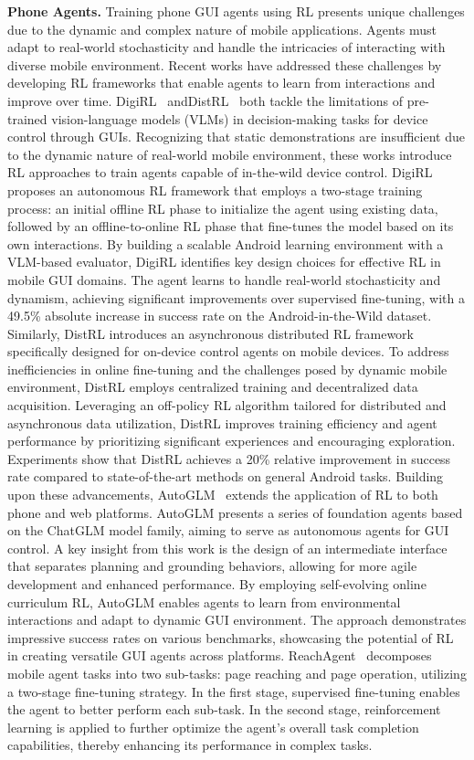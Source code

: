 \noindent\textbf{Phone Agents.}
Training phone GUI agents using RL presents unique challenges due to the dynamic and complex nature of mobile applications. Agents must adapt to real-world stochasticity and handle the intricacies of interacting with diverse mobile environment. Recent works have addressed these challenges by developing RL frameworks that enable agents to learn from interactions and improve over time.
DigiRL~\cite{bai2024digirl} andDistRL~\cite{wang2024distrl} both tackle the limitations of pre-trained vision-language models (VLMs) in decision-making tasks for device control through GUIs. Recognizing that static demonstrations are insufficient due to the dynamic nature of real-world mobile environment, these works introduce RL approaches to train agents capable of in-the-wild device control.
DigiRL proposes an autonomous RL framework that employs a two-stage training process: an initial offline RL phase to initialize the agent using existing data, followed by an offline-to-online RL phase that fine-tunes the model based on its own interactions. By building a scalable Android learning environment with a VLM-based evaluator, DigiRL identifies key design choices for effective RL in mobile GUI domains. The agent learns to handle real-world stochasticity and dynamism, achieving significant improvements over supervised fine-tuning, with a 49.5\% absolute increase in success rate on the Android-in-the-Wild dataset.
Similarly, DistRL introduces an asynchronous distributed RL framework specifically designed for on-device control agents on mobile devices. To address inefficiencies in online fine-tuning and the challenges posed by dynamic mobile environment, DistRL employs centralized training and decentralized data acquisition. Leveraging an off-policy RL algorithm tailored for distributed and asynchronous data utilization, DistRL improves training efficiency and agent performance by prioritizing significant experiences and encouraging exploration. Experiments show that DistRL achieves a 20\% relative improvement in success rate compared to state-of-the-art methods on general Android tasks.
Building upon these advancements, AutoGLM~\cite{liu2024autoglm} extends the application of RL to both phone and web platforms. AutoGLM presents a series of foundation agents based on the ChatGLM model family, aiming to serve as autonomous agents for GUI control. A key insight from this work is the design of an intermediate interface that separates planning and grounding behaviors, allowing for more agile development and enhanced performance. By employing self-evolving online curriculum RL, AutoGLM enables agents to learn from environmental interactions and adapt to dynamic GUI environment. The approach demonstrates impressive success rates on various benchmarks, showcasing the potential of RL in creating versatile GUI agents across platforms.
ReachAgent~\cite{wu2025reachagent} decomposes mobile agent tasks into two sub-tasks: page reaching and page operation, utilizing a two-stage fine-tuning strategy. In the first stage, supervised fine-tuning enables the agent to better perform each sub-task. In the second stage, reinforcement learning is applied to further optimize the agent's overall task completion capabilities, thereby enhancing its performance in complex tasks.


